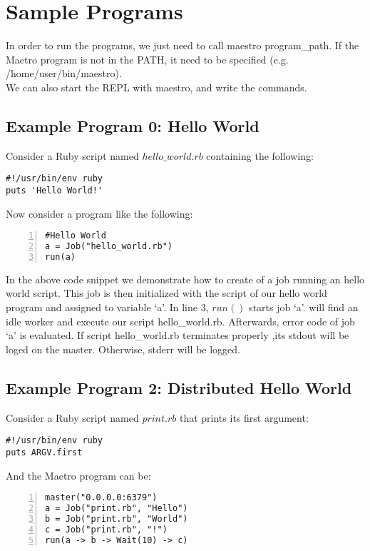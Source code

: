 \section{Sample Programs}
\label{sect:samples}
In order to run the programs, we just need to call maestro program\_path. If the Maetro
program is not in the PATH, it need to be specified (e.g. /home/user/bin/maestro).\\
We can also start the REPL with maestro, and write the commands.

\subsection*{Example Program 0: Hello World}
Consider a Ruby script named $hello\_world.rb$ containing the following:
\begin{verbatim}
#!/usr/bin/env ruby
puts 'Hello World!'
\end{verbatim}
Now consider a \lang{} program like the following:
\begin{Verbatim}[numbers=left]
#Hello World
a = Job("hello_world.rb")
run(a)
\end{Verbatim}

In the above code snippet we demonstrate how to create of a job running an hello world script.
This job is then initialized with the script of our hello world program and
assigned to variable `a'. In line 3, $run()$ starts job `a'. 
\lang{} will find an idle worker and execute our script hello\_world.rb.
Afterwards, error code of job `a' is evaluated. If script hello\_world.rb terminates properly
,its stdout will be loged on the master. Otherwise, stderr will be logged.

\subsection*{Example Program 2: Distributed Hello World}
Consider a Ruby script named $print.rb$ that prints its first argument:
\begin{verbatim}
#!/usr/bin/env ruby
puts ARGV.first
\end{verbatim}
And the Maetro program can be:
\begin{Verbatim}[numbers=left]
master("0.0.0.0:6379")
a = Job("print.rb", "Hello")
b = Job("print.rb", "World")
c = Job("print.rb", "!")
run(a -> b -> Wait(10) -> c)
\end{Verbatim}

